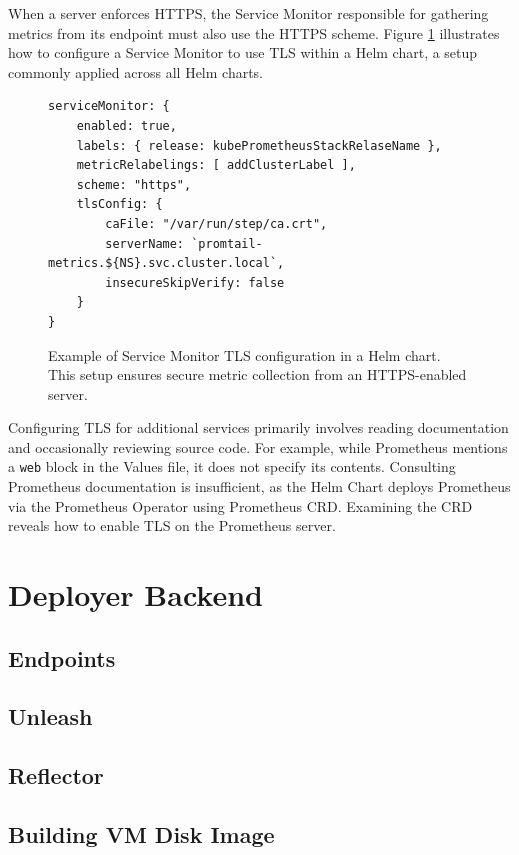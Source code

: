 When a server enforces HTTPS, the Service Monitor responsible for gathering metrics from its endpoint must also use the HTTPS scheme. Figure \ref{fig:service_monitor_tls} illustrates how to configure a Service Monitor to use TLS within a Helm chart, a setup commonly applied across all Helm charts.

\begin{figure}[h]
    \centering
\begin{verbatim}
serviceMonitor: {
    enabled: true,
    labels: { release: kubePrometheusStackRelaseName },
    metricRelabelings: [ addClusterLabel ],
    scheme: "https",
    tlsConfig: {
        caFile: "/var/run/step/ca.crt",
        serverName: `promtail-metrics.${NS}.svc.cluster.local`,
        insecureSkipVerify: false
    }
}
\end{verbatim}
\caption{Example of Service Monitor TLS configuration in a Helm chart. This setup ensures secure metric collection from an HTTPS-enabled server.}
    \label{fig:service_monitor_tls}
\end{figure}

Configuring TLS for additional services primarily involves reading documentation and occasionally reviewing source code. For example, while Prometheus mentions a \texttt{web} block in the Values file, it does not specify its contents. Consulting Prometheus documentation is insufficient, as the Helm Chart deploys Prometheus via the Prometheus Operator using Prometheus CRD. Examining the CRD reveals how to enable TLS on the Prometheus server.

\section{Deployer Backend}

\subsection{Endpoints}

\subsection{Unleash}

\subsection{Reflector}

\subsection{Building VM Disk Image}

